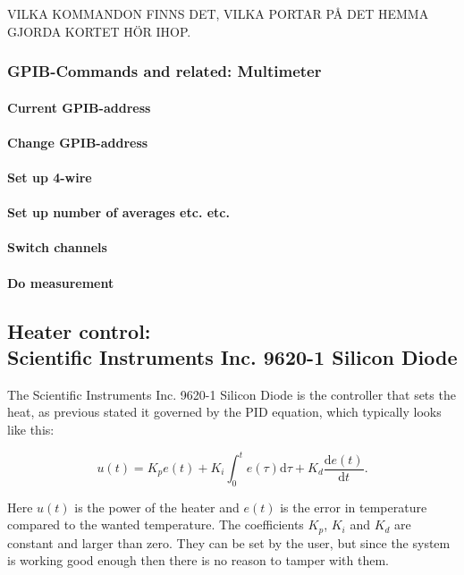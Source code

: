 \documentclass[a4paper,12pt]{article}
\begin{document}
VILKA KOMMANDON FINNS DET, VILKA PORTAR PÅ DET HEMMA GJORDA KORTET HÖR IHOP.

\subsubsection{GPIB-Commands and related: Multimeter}

\paragraph{Current GPIB-address}

\paragraph{Change GPIB-address}

\paragraph{Set up 4-wire}

\paragraph{Set up number of averages etc. etc.}

\paragraph{Switch channels}

\paragraph{Do measurement}


\subsection{Heater control: \\ Scientific Instruments Inc. 9620-1 Silicon Diode}
The Scientific Instruments Inc. 9620-1 Silicon Diode is the controller that sets the heat, as previous stated it governed by the PID equation, which typically looks like this:

\begin{equation}
u(t)= K_pe(t) + K_i\int_0^t \! e(\tau)\mathrm{d}\tau + K_d\frac{\mathrm{d}e(t)}{\mathrm{d}t}.
\end{equation}

\noindent Here $u(t)$ is the power of the heater and $e(t)$ is the error in temperature compared to the wanted temperature. The coefficients $K_p$, $K_i$ and $K_d$ are constant and larger than zero. They can be set by the user, but since the system is working good enough then there is no reason to tamper with them. 
\end{document}
